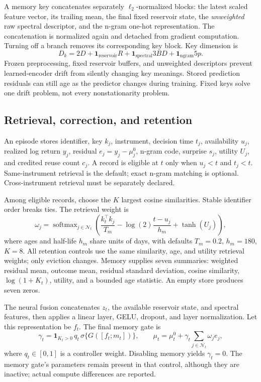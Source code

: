 \documentclass[11pt,a4paper]{article}
\newcommand{\ind}{\mathbf 1}
\begin{document}
A memory key concatenates separately $\ell_2$-normalized blocks: the latest scaled feature vector, its trailing mean, the final fixed reservoir state, the \emph{unweighted} raw spectral descriptor, and the n-gram one-hot representation. The concatenation is normalized again and detached from gradient computation. Turning off a branch removes its corresponding key block. Key dimension is
\begin{equation}
D_k=2D+\ind_{\mathrm{reservoir}}R+\ind_{\mathrm{spectral}}3BD+\ind_{\mathrm{ngram}}5p.
\end{equation}
Frozen preprocessing, fixed reservoir buffers, and unweighted descriptors prevent learned-encoder drift from silently changing key meanings. Stored prediction residuals can still age as the predictor changes during training. Fixed keys solve one drift problem, not every nonstationarity problem.

\subsection{Retrieval, correction, and retention}

An episode stores identifier, key $k_j$, instrument, decision time $t_j$, availability $u_j$, realized log return $y_j$, residual $e_j=y_j-\mu^0_j$, n-gram code, surprise $s_j$, utility $U_j$, and credited reuse count $c_j$. A record is eligible at $t$ only when $u_j<t$ and $t_j<t$. Same-instrument retrieval is the default; exact n-gram matching is optional. Cross-instrument retrieval must be separately declared.

Among eligible records, choose the $K$ largest cosine similarities. Stable identifier order breaks ties. The retrieval weight is
\begin{equation}
\omega_j=\operatorname{softmax}_{j\in\mathcal N_t}\left(\frac{k_t^\top k_j}{T_m}-\log(2)\frac{t-u_j}{h_m}+\tanh(U_j)\right),
\end{equation}
where ages and half-life $h_m$ share units of days, with defaults $T_m=0.2$, $h_m=180$, $K=8$. All retention controls use the same similarity, age, and utility retrieval weights; only eviction changes. Memory supplies seven summaries: weighted residual mean, outcome mean, residual standard deviation, cosine similarity, $\log(1+K_t)$, utility, and a bounded age statistic. An empty store produces seven zeros.

The neural fusion concatenates $z_t$, the available reservoir state, and spectral features, then applies a linear layer, GELU, dropout, and layer normalization. Let this representation be $f_t$. The final memory gate is
\begin{equation}
\gamma_t=\ind_{K_t>0}\,q_t\,\sigma\{G([f_t;m_t])\},\qquad
\mu_t=\mu^0_t+\gamma_t\sum_{j\in\mathcal N_t}\omega_je_j,
\end{equation}
where $q_t\in[0,1]$ is a controller weight. Disabling memory yields $\gamma_t=0$. The memory gate's parameters remain present in that control, although they are inactive; actual compute differences are reported.
\end{document}
